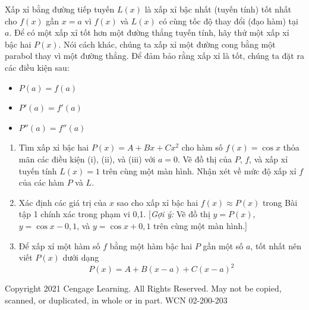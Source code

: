 \vspace{-2pt}
\noindent
\begin{tcolorbox}[
  enhanced,
  colback=projbg,
  colframe=projbg,
  boxrule=0pt,
  arc=0pt,
  left=0pt,
  right=12pt,
  top=10pt,
  bottom=10pt,
  width=\linewidth
]
  \hspace*{0.33\linewidth}%
  \begin{minipage}{0.64\linewidth}
    \fontsize{9.2pt}{11.8pt}\selectfont
    Xấp xỉ bằng đường tiếp tuyến $L(x)$ là xấp xỉ bậc nhất (tuyến tính) tốt nhất cho $f(x)$ gần $x = a$ vì $f(x)$ và $L(x)$ có cùng tốc độ thay đổi (đạo hàm) tại $a$. Để có một xấp xỉ tốt hơn một đường thẳng tuyến tính, hãy thử một xấp xỉ bậc hai $P(x)$. Nói cách khác, chúng ta xấp xỉ một đường cong bằng một parabol thay vì một đường thẳng. Để đảm bảo rằng xấp xỉ là tốt, chúng ta đặt ra các điều kiện sau:
    
    \vspace{4pt}
    \begin{itemize}[leftmargin=*, labelsep=5pt, itemsep=2pt, topsep=2pt]
      \item[(i)] $P(a) = f(a)$ \hfill {}
      \item[(ii)] $P'(a) = f'(a)$ \hfill {}
      \item[(iii)] $P''(a) = f''(a)$ \hfill {}
    \end{itemize}

    \vspace{4pt}
    \begin{enumerate}[label=\textbf{\arabic*.}, leftmargin=*, itemsep=5pt, topsep=4pt]
      \item Tìm xấp xỉ bậc hai $P(x) = A + Bx + Cx^2$ cho hàm số $f(x) = \cos x$ thỏa mãn các điều kiện (i), (ii), và (iii) với $a = 0$. Vẽ đồ thị của $P$, $f$, và xấp xỉ tuyến tính $L(x) = 1$ trên cùng một màn hình. Nhận xét về mức độ xấp xỉ $f$ của các hàm $P$ và $L$.
      \item Xác định các giá trị của $x$ sao cho xấp xỉ bậc hai $f(x) \approx P(x)$ trong Bài tập 1 chính xác trong phạm vi 0{,}1. [\textit{Gợi ý:} Vẽ đồ thị $y = P(x)$, $y = \cos x - 0{,}1$, và $y = \cos x + 0{,}1$ trên cùng một màn hình.]
      \item Để xấp xỉ một hàm số $f$ bằng một hàm bậc hai $P$ gần một số $a$, tốt nhất nên viết $P(x)$ dưới dạng
      \[
        P(x) = A + B(x - a) + C(x - a)^2
      \]
    \end{enumerate}
  \end{minipage}
\end{tcolorbox}

\vfill
\begin{center}
  \fontsize{7pt}{8pt}\selectfont\color{black!70}
  Copyright 2021 Cengage Learning. All Rights Reserved. May not be copied, scanned, or duplicated, in whole or in part. WCN 02-200-203
\end{center}
